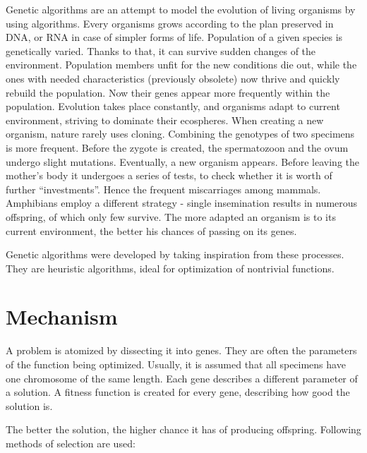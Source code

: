 \documentclass[10pt,oneside]{memoir}
\begin{document}
Genetic algorithms are an attempt to model the evolution of living organisms by using algorithms.
Every organisms grows according to the plan preserved in DNA, or RNA in case of simpler forms of life. Population of a given species is genetically varied. Thanks to that, it can survive sudden changes of the environment. Population members unfit for the new conditions die out, while the ones with needed characteristics (previously obsolete) now thrive and quickly rebuild the population. Now their genes appear more frequently within the population. Evolution takes place constantly, and organisms adapt to current environment, striving to dominate their ecospheres.
When creating a new organism, nature rarely uses cloning. Combining the genotypes of two specimens is more frequent. Before the zygote is created, the spermatozoon and the ovum undergo slight mutations. Eventually, a new organism appears. Before leaving the mother's body it undergoes a series of tests, to check whether it is worth of further ``investments''. Hence the frequent miscarriages among mammals. Amphibians employ a different strategy - single insemination results in numerous offspring, of which only few survive. The more adapted an organism is to its current environment, the better his chances of passing on its genes.


Genetic algorithms were developed by taking inspiration from these processes. They are heuristic algorithms, ideal for optimization of nontrivial functions.


\chapter{Mechanism}
\label{mechanism}

A problem is atomized by dissecting it into genes. They are often the parameters of the function being optimized. Usually, it is assumed that all specimens have one chromosome of the same length. Each gene describes a different parameter of a solution. A fitness function is created for every gene, describing how good the solution is.


The better the solution, the higher chance it has of producing offspring. Following methods of selection are used:
\end{document}
